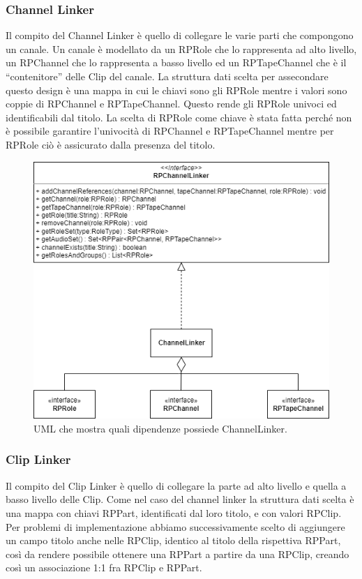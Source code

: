 \documentclass[a4paper,12pt]{report}
\begin{document}
\subsubsection{Channel Linker}
Il compito del Channel Linker è quello di collegare le varie parti che compongono un canale. Un canale è modellato da un RPRole che lo rappresenta ad alto livello, un RPChannel che lo rappresenta a basso livello ed un RPTapeChannel che è il “contenitore” delle Clip del canale. La struttura dati scelta per assecondare questo design è una mappa in cui le chiavi sono gli RPRole mentre i valori sono coppie di RPChannel e RPTapeChannel. Questo rende gli RPRole univoci ed identificabili dal titolo. La scelta di RPRole come chiave è stata fatta perché non è possibile garantire l’univocità di RPChannel e RPTapeChannel mentre per RPRole ciò è assicurato dalla presenza del titolo.

\begin{figure}[H]
\centering{}
\includegraphics[width=\textwidth]{img/channelLinker.png}
\caption{UML che mostra quali dipendenze possiede ChannelLinker.}
\end{figure}

\subsubsection{Clip Linker}
Il compito del Clip Linker è quello di collegare la parte ad alto livello e quella a basso livello delle Clip. Come nel caso del channel linker la struttura dati scelta è una mappa con chiavi RPPart, identificati dal loro titolo, e con valori RPClip. Per problemi di implementazione abbiamo successivamente scelto di aggiungere un campo titolo anche nelle RPClip, identico al titolo della rispettiva RPPart, così da rendere possibile ottenere una RPPart a partire da una RPClip, creando così un associazione 1:1 fra RPClip e RPPart.
\end{document}
